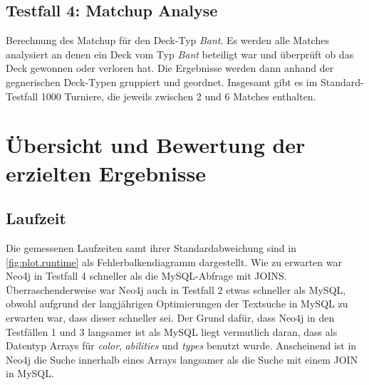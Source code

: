 \subsection{Testfall 4: Matchup Analyse}
Berechnung des Matchup für den Deck-Typ \emph{Bant}. Es werden alle Matches analysiert an denen ein Deck vom Typ \emph{Bant} beteiligt war und überprüft ob das Deck gewonnen oder verloren hat. Die Ergebnisse werden dann anhand der gegnerischen Deck-Typen gruppiert und geordnet. Insgesamt gibt es im Standard-Testfall 1000 Turniere, die jeweils zwischen 2 und 6 Matches enthalten.  


\section{Übersicht und Bewertung der erzielten Ergebnisse}
\subsection{Laufzeit}
Die gemessenen Laufzeiten samt ihrer Standardabweichung sind in \autoref{fig:plot.runtime} als Fehlerbalkendiagramm dargestellt.
Wie zu erwarten war Neo4j in Testfall 4 schneller als die MySQL-Abfrage mit JOINS. Überraschenderweise war Neo4j auch in Testfall 2 etwas schneller als MySQL, obwohl aufgrund der langjährigen Optimierungen der Textsuche in MySQL zu erwarten war, dass dieser schneller sei.
Der Grund dafür, dass Neo4j in den Testfällen 1 und 3 langsamer ist als MySQL liegt vermutlich daran, dass als Datentyp Arrays für \emph{color}, \emph{abilities} und \emph{types} benutzt wurde. Anscheinend ist in Neo4j die Suche innerhalb eines Arrays langsamer als die Suche mit einem JOIN in MySQL.

